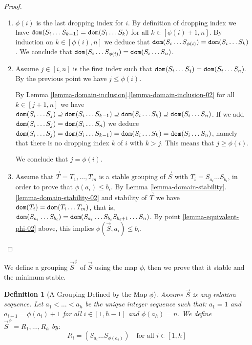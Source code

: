 \documentclass{lmcs}
\newtheorem{definition}[theorem]{Definition}
\begin{document}
\begin{proof}

\begin{enumerate}

\item
$\phi(i)$ is the last dropping index for $i$. By definition of dropping index we have
${\tt dom}(S_i \ldots S_{k-1}) = {\tt dom}(S_i \ldots S_{k})$ for all $k \in [\phi(i)+1,n]$. By induction
on $k \in [\phi(i),n]$ we deduce that 
${\tt dom}(S_i \ldots S_{\phi(i)}) = {\tt dom}(S_i \ldots S_k)$. We conclude that 
${\tt dom}(S_i \ldots S_{\phi(i)}) = {\tt dom}(S_i \ldots S_n)$.

\item
Assume $j \in [i,n]$ is the first index such that ${\tt dom}(S_i \ldots S_{j}) = {\tt dom}(S_i \ldots S_n)$. 
By the previous point we have $j \le \phi(i)$.

By Lemma \ref{lemma-domain-inclusion}.\ref{lemma-domain-inclusion-02}
for all $k \in [j+1,n]$ we have 
${\tt dom}(S_i \ldots S_j) \supseteq {\tt dom}(S_i \ldots S_{k-1}) \supseteq 
{\tt dom}(S_i \ldots S_{k}) \supseteq {\tt dom}(S_i \ldots S_n)$.
If we add ${\tt dom}(S_i \ldots S_{j}) = {\tt dom}(S_i \ldots S_n)$ we deduce 
${\tt dom}(S_i \ldots S_j) = {\tt dom}(S_i \ldots S_{k-1}) = 
{\tt dom}(S_i \ldots S_{k}) = {\tt dom}(S_i \ldots S_n)$, namely that there is no dropping
index $k$ of $i$ with $k>j$. This means that $j \ge \phi(i)$. 

We conclude that $j = \phi(i)$.

\item
\label{lemma-equivalent-phi-03}
Assume that $\vec{T} = T_1, \ldots, T_m$ is a stable grouping of $\vec{S}$
with $T_i= S_{a_i} \ldots S_{b_i}$, in order to prove that $\phi(a_i) \le b_i$. 
By Lemma \ref{lemma-domain-stability}.\ref{lemma-domain-stability-02} 
and stability of $\vec{T}$ we have ${\tt dom}(T_i) = {\tt dom}(T_i \ldots T_m)$,
that is, ${\tt dom}(S_{a_i} \ldots S_{b_i}) = {\tt dom}(S_{a_i} \ldots S_{b_i} S_{b_i +1} \ldots S_n)$.
By point \ref{lemma-equivalent-phi-02} above, this implies $\phi(\vec{S},a_i) \le b_i$.

\end{enumerate}
\end{proof}


We define a grouping $\vec{S}^{\phi}$ of $\vec{S}$ using the map $\phi$,
then we prove that it stable and the minimum stable.

\begin{definition} [A Grouping Defined by the Map $\phi$]
Assume $\vec{S}$ is any relation sequence.
Let $a_1 < \ldots < a_h$ be the unique integer sequence such that:
$a_1=1$ and $a_{i+1} = \phi(a_i)+1$ for all $i \in [1,h-1]$ and $\phi(a_{h}) = n$.
We define $\vec{S}^{\phi} = R_1, \ldots, R_h$ by: 
$$
R_i = (S_{a_i}\ldots S_{\phi(a_i)}) \ \ \ \mbox{ for all $i \in [1,h]$}
$$ 
\end{definition}
\end{document}
